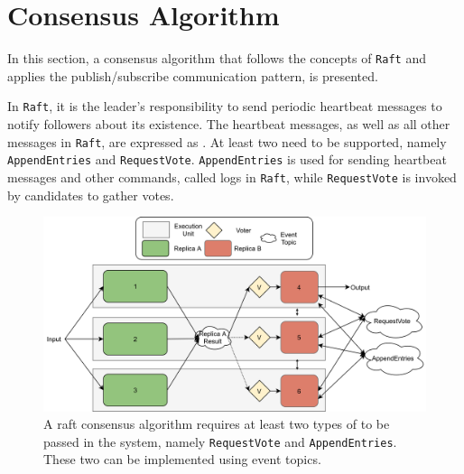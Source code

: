 \section{Consensus Algorithm}
\label{sec:ImpConsensusAlgorithm}

In this section, a consensus algorithm that follows the concepts of \texttt{Raft} and applies the  publish/subscribe communication pattern, is presented.

In \texttt{Raft}, it is the leader's responsibility to send periodic heartbeat messages to notify followers about its existence.
The heartbeat messages, as well as all other messages in \texttt{Raft}, are expressed as .
At least two  need to be supported, namely \texttt{AppendEntries} and \texttt{RequestVote}.
\texttt{AppendEntries} is used for sending heartbeat messages and other commands, called logs in \texttt{Raft}, while \texttt{RequestVote} is invoked by candidates to gather votes.

\begin{figure}[!hb]
	\centering
	\includegraphics[width=0.9\linewidth]{images/ThreeEUConsensusDDS}
	\caption{A raft consensus algorithm requires at least two types of  to be passed in the system, namely \texttt{RequestVote} and \texttt{AppendEntries}. These two can be implemented using  event topics.}
	\label{fig:ThreeRepConsensusDDS}
\end{figure}

